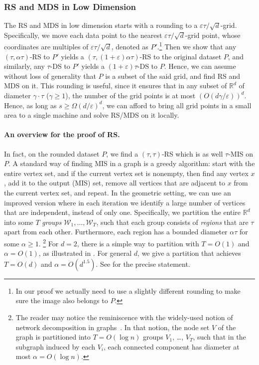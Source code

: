 \documentclass[11pt,letterpaper]{article}
\theoremstyle{plain}
\theoremstyle{definition}
\theoremstyle{remark}
\renewcommand{\epsilon}{\ensuremath{\varepsilon}}
\let\epsilon\varepsilon
\begin{document}
\subsubsection{RS and MDS in Low Dimension}
\label{sec:intro_mis_and_mds}
The RS and MDS in low dimension starts with a rounding to a $\epsilon \tau / \sqrt d$-grid.
Specifically, we move each data point to the nearest $\epsilon \tau / \sqrt{d}$-grid point, whose coordinates are multiples of $\epsilon \tau / \sqrt{d}$, denoted as $P'$.\footnote{In our proof we actually need to use a slightly different rounding to make sure the image also belongs to $P$.}
Then we show that any $(\tau, \alpha \tau)$-RS to $P'$ yields a $(\tau, (1 + \epsilon)\alpha \tau)$-RS to the original dataset $P$,
and similarly, any $\tau$-DS to $P'$ yields a $(1 + \epsilon)\tau$-DS to $P$.
Hence, we can assume without loss of generality that $P$ is a subset of the said grid,
and find RS and MDS on it.
This rounding is useful,
since it ensures that in any subset of $\mathbb{R}^d$ of diameter $\gamma \cdot \tau$ ($\gamma \geq 1$),
the number of the grid points is at most $(O(d \gamma / \epsilon))^d$.
Hence, as long as $s \geq \Omega(d / \epsilon)^{d}$, we can afford to bring all grid points in a small area to a single machine and solve RS/MDS on it locally.








\paragraph{An overview for the proof of RS.}
In fact, on the rounded dataset $P$, we find a $(\tau, \tau)$-RS which is as well $\tau$-MIS on $P$.
A standard way of finding MIS in a graph is a greedy algorithm: start with the entire vertex set,
and if the current vertex set is nonempty, then find any vertex $x$, add it to the output (MIS) set,
remove all vertices that are adjacent to $x$ from the current vertex set, and repeat.
In the geometric setting, we can use an improved version where in each iteration
we identify a large number of vertices that are independent, instead of only one.
Specifically,
we partition the entire $\mathbb{R}^d$ into some $T$ \textit{groups} $\mathcal{W}_{1}, \ldots, \mathcal{W}_{T}$,
such that each group consists of \textit{regions} that are $\tau$ apart from each other.
Furthermore, each region has a bounded diameter $\alpha \tau$ for some $\alpha \geq 1$. \footnote{The reader may notice the reminiscence with the widely-used notion of network decomposition in graphs~\cite{awerbuch1989network,rozhovn2020polylogarithmic}. In that notion, the node set $V$ of the graph is partitioned into $T=O(\log n)$ groups $V_1$, \dots, $V_T$, such that in the subgraph induced by each $V_i$, each connected component has diameter at most $\alpha=O(\log n).$}
For $d = 2$, there is a simple way to partition with $T = O(1)$ and $\alpha = O(1)$,
as illustrated in .
For general $d$, we give a partition that achieves $T = O(d)$ and $\alpha = O(d^{1.5})$. See  for the precise statement.
\end{document}
